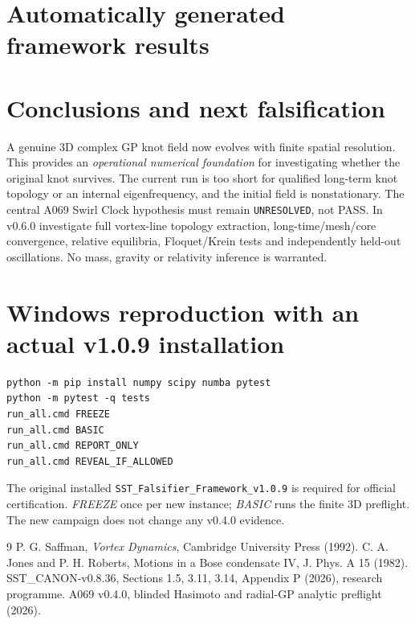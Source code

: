 \documentclass[10pt,a4paper]{article}
\begin{document}
\section{Automatically generated framework results}
\section{Conclusions and next falsification}
A genuine 3D complex GP knot field now evolves with finite spatial resolution. This provides an \emph{operational numerical foundation} for investigating whether the original knot survives. The current run is too short for qualified long-term knot topology or an internal eigenfrequency, and the initial field is nonstationary. The central A069 Swirl Clock hypothesis must remain \texttt{UNRESOLVED}, not PASS. In v0.6.0 investigate full vortex-line topology extraction, long-time/mesh/core convergence, relative equilibria, Floquet/Krein tests and independently held-out oscillations. No mass, gravity or relativity inference is warranted.
\section{Windows reproduction with an actual v1.0.9 installation}
\begin{verbatim}
python -m pip install numpy scipy numba pytest
python -m pytest -q tests
run_all.cmd FREEZE
run_all.cmd BASIC
run_all.cmd REPORT_ONLY
run_all.cmd REVEAL_IF_ALLOWED
\end{verbatim}
The original installed \texttt{SST\_Falsifier\_Framework\_v1.0.9} is required for official certification. \emph{FREEZE} once per new instance; \emph{BASIC} runs the finite 3D preflight. The new campaign does not change any v0.4.0 evidence.
\begin{thebibliography}{9}
 P. G. Saffman, \emph{Vortex Dynamics}, Cambridge University Press (1992).
 C. A. Jones and P. H. Roberts, Motions in a Bose condensate IV, J. Phys. A 15 (1982).
 SST\_CANON-v0.8.36, Sections 1.5, 3.11, 3.14, Appendix P (2026), research programme.
 A069 v0.4.0, blinded Hasimoto and radial-GP analytic preflight (2026).
\end{thebibliography}
\end{document}
